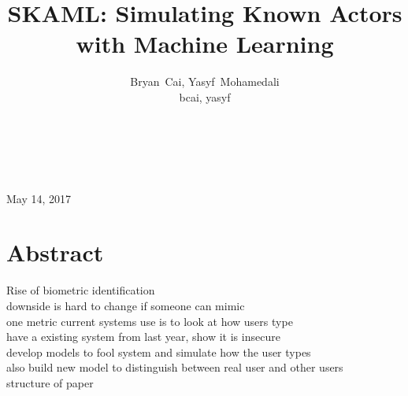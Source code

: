 \documentclass{amsart}
\title{SKAML: Simulating Known Actors with Machine Learning}
\author{Bryan~Cai, Yasyf~Mohamedali\\ \MakeLowercase{bcai, yasyf}}
\begin{document}
\begin{titlepage}
\centering
~
\vspace{7 cm}
\maketitle
~\\
May 14, 2017
\vfill

\end{titlepage}

\section{Abstract}
Rise of biometric identification \\
downside is hard to change if someone can mimic \\
one metric current systems use is to look at how users type \\
have a existing system from last year, show it is insecure \\
develop models to fool system and simulate how the user types \\
also build new model to distinguish between real user and other users \\
structure of paper \\
\end{document}
